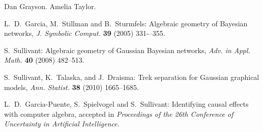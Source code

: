 \documentclass[10pt]{article}
\theoremstyle{definition}
\begin{document}
\bigskip \bigskip

 Dan Grayson. Amelia Taylor.

\bigskip

\begin{thebibliography}{2}

 L.~D.~Garcia, M.~Stillman and B.~Sturmfels: Algebraic geometry of Bayesian networks, {\em J. Symbolic Comput.}
  {\bf 39} (2005) 331-–355.

 S.~Sullivant: Algebraic geometry of Gaussian Bayesian
  networks, {\em Adv. in Appl. Math.} {\bf 40} (2008) 482--513.

S.~Sullivant, K.~Talaska, and J.~Draisma: Trek separation for Gaussian
graphical models, {\em Ann. Statist.} {\bf 38} (2010) 1665--1685. 

 L.~D.~Garcia-Puente, S.~Spielvogel and S.~Sullivant: Identifying
causal effects with computer algebra, accepted in {\em Proceedings of the 26th
Conference of Uncertainty in Artificial Intelligence}.

\end{thebibliography}
\end{document}
